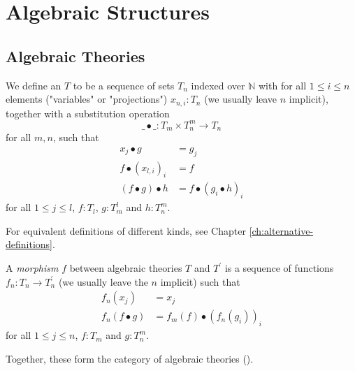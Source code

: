 \chapter{Algebraic Structures}\label{ch:algebraic-structures}

\section{Algebraic Theories}\label{sec:algebraic-theories}

\begin{definition}
  We define an  $ T $ to be a sequence of sets $ T_n $ indexed over $ \mathbb N $ with for all $ 1 \leq i \leq n $ elements ("variables" or "projections") $ x_{n, i}: T_n $ (we usually leave $ n $ implicit), together with a substitution operation
  \[ \_ \bullet \_: T_m \times T_n^m \to T_n \]
  for all $ m, n $, such that
  \begin{align*}
    x_j \bullet g &= g_j\\
    f \bullet (x_{l, i})_i &= f\\
    (f \bullet g) \bullet h &= f \bullet (g_i \bullet h)_i
  \end{align*}
  for all $ 1 \leq j \leq l $, $ f: T_l $, $ g: T_m^l $ and $ h: T_n^m $.
\end{definition}

\begin{remark}
  For equivalent definitions of different kinds, see Chapter \ref{ch:alternative-definitions}.
\end{remark}

\begin{definition}
  A \textit{morphism} $ f $ between algebraic theories $ T $ and $ T^\prime $ is a sequence of functions $ f_n: T_n \to T^\prime_n $ (we usually leave the $ n $ implicit) such that
  \begin{align*}
    f_n(x_j) &= x_j\\
    f_n(f \bullet g) &= f_m(f) \bullet (f_n(g_i))_i
  \end{align*}
  for all $ 1 \leq j \leq n $, $ f: T_m $ and $ g: T_n^m $.
\end{definition}

Together, these form the category of algebraic theories \iindex{$ \AlgTh $} ().

